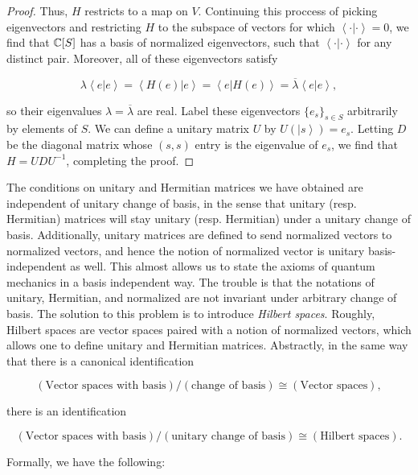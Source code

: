\documentclass{article}
\theoremstyle{definition}
\numberwithin{figure}{section}
\begin{document}
\begin{proof}
Thus, $H$ restricts to a map on $V$. Continuing this proccess of picking eigenvectors and restricting $H$ to the subspace of vectors for which $\left<\cdot|\cdot\right>=0$, we find that $\mathbb{C}[S]$ has a basis of normalized eigenvectors, such that $\left<\cdot|\cdot\right>$ for any distinct pair. Moreover, all of these eigenvectors satisfy

$$\lambda \left<e | e\right>=\left<H(e) | e\right>=\left<e | H(e)\right>=\overline{\lambda}\left<e | e\right>,$$

so their eigenvalues $\lambda=\overline{\lambda}$ are real. Label these eigenvectors $\{e_s\}_{s\in S}$ arbitrarily by elements of $S$. We can define a unitary matrix $U$ by $U(\left|s\right>)=e_s$. Letting $D$ be the diagonal matrix whose $(s,s)$ entry is the eigenvalue of $e_s$, we find that $H=U D U^{-1}$, completing the proof.
\end{proof}
 
The conditions on unitary and Hermitian matrices we have obtained are independent of unitary change of basis, in the sense that unitary (resp. Hermitian) matrices will stay unitary (resp. Hermitian) under a unitary change of basis. Additionally, unitary matrices are defined to send normalized vectors to normalized vectors, and hence the notion of normalized vector is unitary basis-independent as well. This almost allows us to state the axioms of quantum mechanics in a basis independent way. The trouble is that the notations of unitary, Hermitian, and normalized are not invariant under arbitrary change of basis. The solution to this problem is to introduce \textit{Hilbert spaces}. Roughly, Hilbert spaces are vector spaces paired with a notion of normalized vectors, which allows one to define unitary and Hermitian matrices. Abstractly, in the same way that there is a canonical identification

$$
\left(\text{Vector spaces with basis}\right)/\left(\text{change of basis}\right)\cong
\left(\text{Vector spaces}\right),
$$

there is an identification

$$
\left(\text{Vector spaces with basis}\right)/\left(\text{unitary change of basis}\right)\cong
\left(\text{Hilbert spaces}\right).
$$

Formally, we have the following:
\end{document}

